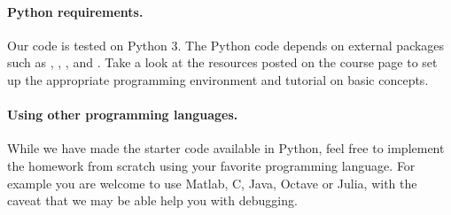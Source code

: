 \paragraph{Python requirements.}
Our code is tested on Python 3.
The Python code depends on external
packages such as , , , and .
Take a look at the resources posted on the course page to set up the
appropriate programming environment and tutorial on basic concepts.


\paragraph{Using other programming languages.}
While we have made the starter code available in Python, 
feel free to implement the homework from scratch using your favorite
programming language. For example you are welcome to use Matlab, C, Java,
Octave or Julia, with the caveat that we may be able help you with
debugging.






